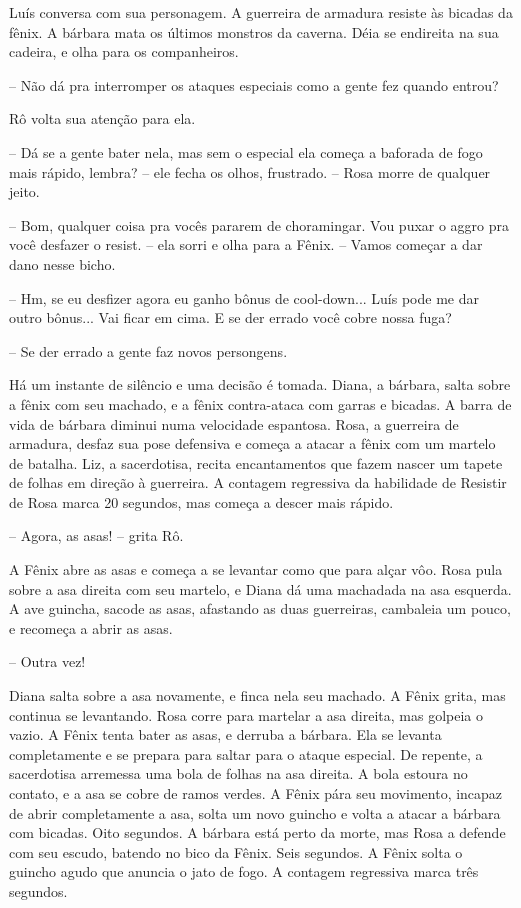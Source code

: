 Luís conversa com sua personagem. A guerreira de armadura resiste às bicadas da fênix. A bárbara mata os últimos monstros da caverna.
Déia se endireita na sua cadeira, e olha para os companheiros.

-- Não dá pra interromper os ataques especiais como a gente fez quando entrou?

Rô volta sua atenção para ela.

-- Dá se a gente bater nela, mas sem o especial ela começa a baforada de fogo mais rápido, lembra? -- ele fecha os olhos, frustrado. -- Rosa morre de qualquer jeito.

-- Bom, qualquer coisa pra vocês pararem de choramingar. Vou puxar o aggro pra você desfazer o resist. -- ela sorri e olha para a Fênix. 
-- Vamos começar a dar dano nesse bicho.

-- Hm, se eu desfizer agora eu ganho bônus de cool-down... Luís pode me dar outro bônus... Vai ficar em cima. E se der errado você cobre nossa fuga?

-- Se der errado a gente faz novos persongens.

Há um instante de silêncio e uma decisão é tomada. Diana, a bárbara, salta sobre a fênix com seu machado, e a fênix contra-ataca com garras e bicadas.
A barra de vida de bárbara diminui numa velocidade espantosa.
Rosa, a guerreira de armadura, desfaz sua pose defensiva e começa a atacar a fênix com um martelo de batalha. Liz, a sacerdotisa, recita encantamentos
que fazem nascer um tapete de folhas em direção à guerreira. A contagem regressiva da habilidade de Resistir de Rosa marca 20 segundos, mas começa a descer mais rápido.

-- Agora, as asas! -- grita Rô.

A Fênix abre as asas e começa a se levantar como que para alçar vôo. 
Rosa pula sobre a asa direita com seu martelo, e Diana dá uma machadada na asa esquerda.
A ave guincha, sacode as asas, afastando as duas guerreiras, cambaleia um pouco, e recomeça a abrir as asas.

-- Outra vez!

Diana salta sobre a asa novamente, e finca nela seu machado. A Fênix grita, mas continua se levantando.
Rosa corre para martelar a asa direita, mas golpeia o vazio.
A Fênix tenta bater as asas, e derruba a bárbara. Ela se levanta completamente e se prepara para saltar para o ataque especial.
De repente, a sacerdotisa arremessa uma bola de folhas na asa direita. A bola estoura no contato,
e a asa se cobre de ramos verdes. A Fênix pára seu movimento, incapaz de abrir completamente a asa, 
solta um novo guincho e volta a atacar a bárbara com bicadas. Oito segundos.
A bárbara está perto da morte, mas Rosa a defende com seu escudo, batendo no bico da Fênix. Seis segundos.
A Fênix solta o guincho agudo que anuncia o jato de fogo. A contagem regressiva marca três segundos.

